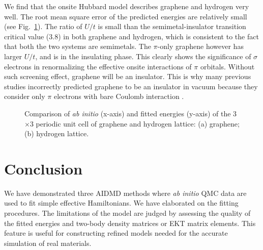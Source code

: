 \documentclass[aps, prb]{revtex4-1}
\begin{document}
We find that the onsite Hubbard model describes graphene and hydrogen very well. The root mean square error of the predicted energies are relatively small (see Fig.~\ref{fig:ne_aidmd_gh}). The ratio of $U/t$ is small than the semimetal-insulator transition critical value (3.8) in both graphene and hydrogen, which is consistent to the fact that both the two systems are semimetals.  The $\pi$-only graphene however has larger $U/t$, and is in the insulating phase. This clearly shows the significance of $\sigma$ electrons in renormalizing the effective onsite interactions of $\pi$ orbitals. Without such screening effect, graphene will be an insulator. This is why many previous studies incorrectly predicted graphene to be an insulator in vacuum because they consider only $\pi$ electrons with bare Coulomb interaction \cite{DrutPRL2009, DrutPRB2009,  Smith2014}.
\begin{figure}[htb]
\centering
{}
\caption{Comparison of \textit{ab initio} (x-axis) and fitted energies (y-axis) of the 3$\times$3 periodic unit cell of graphene and hydrogen lattice: (a) graphene; (b) hydrogen lattice.}\label{fig:ne_aidmd_gh}
\end{figure}


\section{Conclusion}
We have demonstrated three AIDMD methods where \textit{ab initio} QMC data are used to fit simple effective Hamiltonians. We have elaborated on the fitting procedures. The limitations of the model are judged by assessing the quality of the fitted energies and two-body density matrices or EKT matrix elements. This feature is useful for constructing refined models needed for the accurate simulation of real materials.
\end{document}
